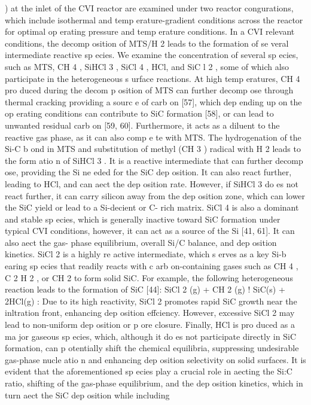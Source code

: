 \documentclass[10pt, letterpaper]{article}
\begin{document}
) at the inlet of the CVI reactor are examined under two reactor congurations, which
include isothermal and temp erature-gradient conditions across the reactor for optimal op erating pressure
and temp erature conditions.
In a CVI relevant conditions, the decomp osition of MTS/H
2
leads to the formation of se veral intermediate
reactive sp ecies. We examine the concentration of several sp ecies, such as MTS, CH
4
, SiHCl
3
, SiCl
4
, HCl,
and SiC l
2
, some of which also participate in the heterogeneous s urface reactions. At high temp eratures,
CH
4
pro duced during the decom p osition of MTS can further decomp ose through thermal cracking providing
a sourc e of carb on [57], which dep ending up on the op erating conditions can contribute to SiC formation
[58], or can lead to unwanted residual carb on [59, 60]. Furthermore, it acts as a diluent to the reactive gas
phase, as it can also comp e te with MTS. The hydrogenation of the Si-C b ond in MTS and substitution of
methyl (CH
3
) radical with H
2
leads to the form atio n of SiHCl
3
. It is a reactive intermediate that can further
decomp ose, providing the Si ne eded for the SiC dep osition. It can also react further, leading to HCl, and
can aect the dep osition rate. However, if SiHCl
3
do es not react further, it can carry silicon away from the
dep osition zone, which can lower the SiC yield or lead to a Si-decient or C- rich matrix. SiCl
4
is also a
dominant and stable sp ecies, which is generally inactive toward SiC formation under typical CVI conditions,
however, it can act as a source of the Si [41, 61]. It can also aect the gas- phase equilibrium, overall Si/C
balance, and dep osition kinetics. SiCl
2
is a highly re active intermediate, which s erves as a key Si-b earing
sp ecies that readily reacts with c arb on-containing gases such as CH
4
, C
2
H
2
, or CH
2
to form solid SiC. For
example, the following heterogeneous reaction leads to the formation of SiC [44]:
SiCl
2
(g) + CH
2
(g)
!
SiC(s) + 2HCl(g)
:
Due to its high reactivity, SiCl
2
promotes rapid SiC growth near the inltration front, enhancing dep osition
effciency. However, excessive SiCl
2
may lead to non-uniform dep osition or p ore closure. Finally, HCl is
pro duced as a ma jor gaseous sp ecies, which, although it do es not participate directly in SiC formation,
can p otentially shift the chemical equilibria, suppressing undesirable gas-phase nucle atio n and enhancing
dep osition selectivity on solid surfaces.
It is evident that the aforementioned sp ecies play a crucial role in aecting the Si:C ratio, shifting of the
gas-phase equilibrium, and the dep osition kinetics, which in turn aect the SiC dep osition while including
\end{document}
